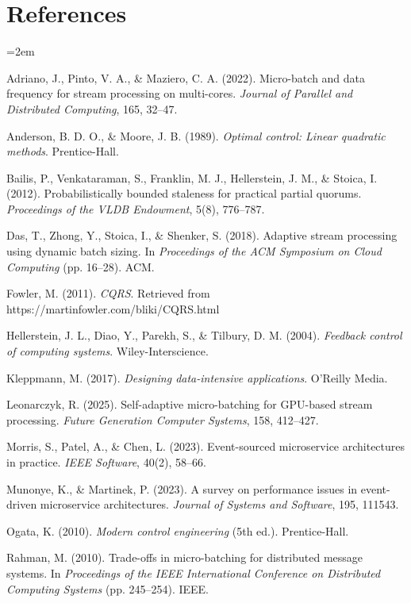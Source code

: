 \documentclass[10pt,a4paper]{article}
\begin{document}
\section*{References}

\begin{flushleft}
\setlength{\parindent}{-2em}
\leftskip=2em

Adriano, J., Pinto, V. A., \& Maziero, C. A. (2022). Micro-batch and data frequency for stream processing on multi-cores. \textit{Journal of Parallel and Distributed Computing}, 165, 32--47.

Anderson, B. D. O., \& Moore, J. B. (1989). \textit{Optimal control: Linear quadratic methods}. Prentice-Hall.

Bailis, P., Venkataraman, S., Franklin, M. J., Hellerstein, J. M., \& Stoica, I. (2012). Probabilistically bounded staleness for practical partial quorums. \textit{Proceedings of the VLDB Endowment}, 5(8), 776--787.

Das, T., Zhong, Y., Stoica, I., \& Shenker, S. (2018). Adaptive stream processing using dynamic batch sizing. In \textit{Proceedings of the ACM Symposium on Cloud Computing} (pp. 16--28). ACM.

Fowler, M. (2011). \textit{CQRS}. Retrieved from https://martinfowler.com/bliki/CQRS.html

Hellerstein, J. L., Diao, Y., Parekh, S., \& Tilbury, D. M. (2004). \textit{Feedback control of computing systems}. Wiley-Interscience.

Kleppmann, M. (2017). \textit{Designing data-intensive applications}. O'Reilly Media.

Leonarczyk, R. (2025). Self-adaptive micro-batching for GPU-based stream processing. \textit{Future Generation Computer Systems}, 158, 412--427.

Morris, S., Patel, A., \& Chen, L. (2023). Event-sourced microservice architectures in practice. \textit{IEEE Software}, 40(2), 58--66.

Munonye, K., \& Martinek, P. (2023). A survey on performance issues in event-driven microservice architectures. \textit{Journal of Systems and Software}, 195, 111543.

Ogata, K. (2010). \textit{Modern control engineering} (5th ed.). Prentice-Hall.

Rahman, M. (2010). Trade-offs in micro-batching for distributed message systems. In \textit{Proceedings of the IEEE International Conference on Distributed Computing Systems} (pp. 245--254). IEEE.


\end{flushleft}
\end{document}
